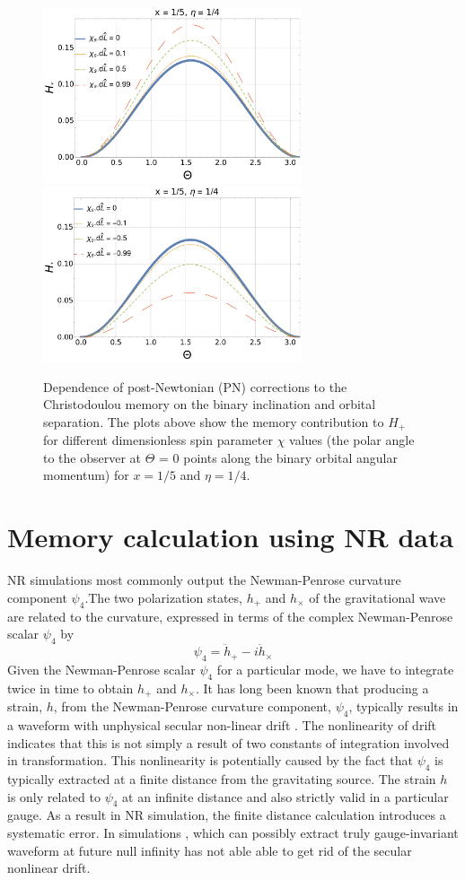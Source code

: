 \documentclass[twocolumn,showpacs,aps,prd,nobibnotes,floatfix]{revtex4-1}
\begin{document}
\begin{figure}
	\includegraphics[width=3.0in]{../plots/PNmemorycontributionHpAlginedSpinAngular.pdf}
	\includegraphics[width=3.0in]{../plots/PNmemorycontributionHpAntiAlginedSpinAngular.pdf}
	\caption{Dependence of post-Newtonian (PN) corrections to the Christodoulou memory on the binary inclination and orbital separation. The plots above show the memory contribution to $H_+$ for different dimensionless spin parameter $\chi$ values (the polar angle to the observer at $\Theta$ = 0 points along the binary orbital angular momentum) for $x = 1/5$ and $\eta=1/4$.}
\end{figure}
\section{Memory calculation using NR data}
NR simulations most commonly output the Newman-Penrose curvature component $\psi_4$.The two polarization states, $h_{+}$ and $h_{\times}$ of the gravitational wave are related to the curvature, expressed in terms 	of the complex Newman-Penrose scalar $\psi_4$ by 
\begin{equation}
\psi_4 = \ddot{h}_+ - \mathit{i}\ddot{h}_{\times}
\end{equation}
Given the Newman-Penrose scalar $\psi_4$ for a particular mode, we have to integrate twice in time to obtain $h_{+}$ and $h_{\times}$. It has long been known that producing a strain, $h$, from the Newman-Penrose curvature component, $\psi_4$, typically results in a waveform with unphysical secular non-linear drift \cite{Berti2007}. The nonlinearity of drift indicates that this is not simply a result of two constants of integration involved in transformation. This nonlinearity is potentially caused by the fact that $\psi_4$ is typically extracted at a finite distance from the gravitating source. The strain $h$ is only related to $\psi_4$ at an infinite distance and also strictly valid in a particular gauge. As a result in NR simulation, the finite distance calculation introduces a systematic error. In simulations \cite{Hannam2009, Reisswig2009}, which can possibly extract truly gauge-invariant waveform at future null infinity has not able able to get rid of the secular nonlinear drift.
\end{document}
